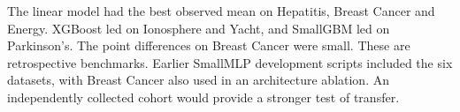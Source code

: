 The linear model had the best observed mean on Hepatitis, Breast Cancer and Energy. XGBoost led on Ionosphere and Yacht, and SmallGBM led on Parkinson's. The point differences on Breast Cancer were small. These are retrospective benchmarks. Earlier SmallMLP development scripts included the six datasets, with Breast Cancer also used in an architecture ablation. An independently collected cohort would provide a stronger test of transfer.